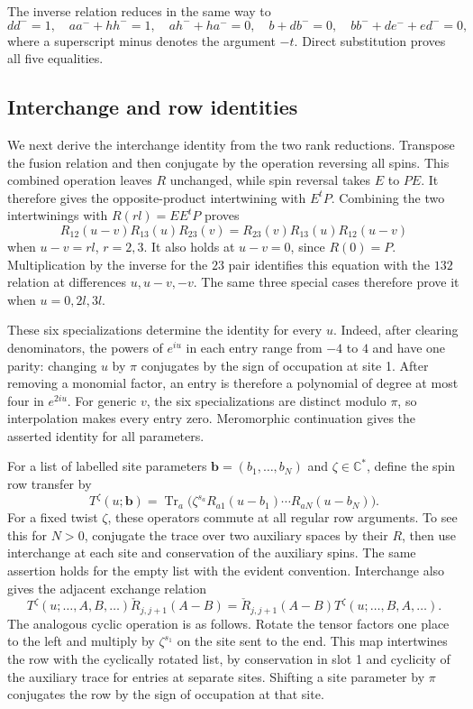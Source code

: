 The inverse relation reduces in the same way to
\[
 dd^-=1,\quad aa^-+hh^-=1,\quad ah^-+ha^-=0,\quad b+d b^-=0,\quad
 b b^-+d e^-+e d^-=0,
\]
where a superscript minus denotes the argument \(-t\). Direct substitution proves all five equalities.

\subsection{Interchange and row identities}

We next derive the interchange identity from the two rank reductions. Transpose the fusion relation and then conjugate by the operation reversing all spins. This combined operation leaves \(R\) unchanged, while spin reversal takes \(E\) to \(PE\). It therefore gives the opposite-product intertwining with \(E^t P\). Combining the two intertwinings with \(R(rl)=EE^tP\) proves
\[
 R_{12}(u-v)R_{13}(u)R_{23}(v)=R_{23}(v)R_{13}(u)R_{12}(u-v)
\]
when \(u-v=rl\), \(r=2,3\). It also holds at \(u-v=0\), since \(R(0)=P\). Multiplication by the inverse for the \(23\) pair identifies this equation with the \(132\) relation at differences \(u,u-v,-v\). The same three special cases therefore prove it when \(u=0,2l,3l\).

These six specializations determine the identity for every \(u\). Indeed, after clearing denominators, the powers of \(e^{iu}\) in each entry range from \(-4\) to \(4\) and have one parity: changing \(u\) by \(\pi\) conjugates by the sign of occupation at site 1. After removing a monomial factor, an entry is therefore a polynomial of degree at most four in \(e^{2iu}\). For generic \(v\), the six specializations are distinct modulo \(\pi\), so interpolation makes every entry zero. Meromorphic continuation gives the asserted identity for all parameters.

For a list of labelled site parameters \(\mathbf b=(b_1,\ldots,b_N)\) and \(\zeta\in\mathbb C^*\), define the spin row transfer by
\[
 T^\zeta(u;\mathbf b)=\operatorname{Tr}_a\big(\zeta^{s_a} R_{a1}(u-b_1)\cdots R_{aN}(u-b_N)\big).
\]
For a fixed twist \(\zeta\), these operators commute at all regular row arguments. To see this for \(N>0\), conjugate the trace over two auxiliary spaces by their \(R\), then use interchange at each site and conservation of the auxiliary spins. The same assertion holds for the empty list with the evident convention. Interchange also gives the adjacent exchange relation
\[
 T^\zeta(u;\ldots,A,B,\ldots)\check R_{j,j+1}(A-B)
 =\check R_{j,j+1}(A-B)T^\zeta(u;\ldots,B,A,\ldots).
\]
The analogous cyclic operation is as follows. Rotate the tensor factors one place to the left and multiply by \(\zeta^{s_1}\) on the site sent to the end. This map intertwines the row with the cyclically rotated list, by conservation in slot 1 and cyclicity of the auxiliary trace for entries at separate sites. Shifting a site parameter by \(\pi\) conjugates the row by the sign of occupation at that site.

